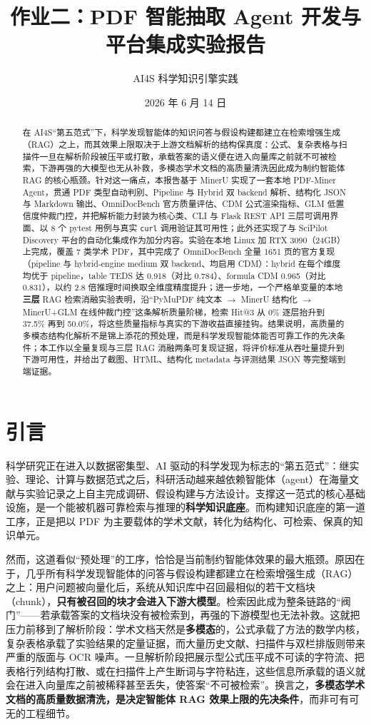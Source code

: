 \documentclass[UTF8,a4paper,11pt]{ctexart}
\title{\textbf{作业二：PDF 智能抽取 Agent 开发与平台集成实验报告}}
\author{AI4S 科学知识引擎实践}
\date{2026 年 6 月 14 日}
\begin{document}
\maketitle

\begin{abstract}
在 AI4S“第五范式”下，科学发现智能体的知识问答与假设构建都建立在检索增强生成（RAG）之上，而其效果上限取决于上游文档解析的结构保真度：公式、复杂表格与扫描件一旦在解析阶段被压平或打散，承载答案的语义便在进入向量库之前就不可被检索，下游再强的大模型也无从补救，多模态学术文档的高质量清洗因此成为制约智能体 RAG 的核心瓶颈。针对这一痛点，本报告基于 MinerU 实现了一套本地 PDF-Miner Agent，贯通 PDF 类型自动判别、Pipeline 与 Hybrid 双 backend 解析、结构化 JSON 与 Markdown 输出、OmniDocBench 官方质量评估、CDM 公式渲染指标、GLM 低置信度仲裁门控，并把解析能力封装为核心类、CLI 与 Flask REST API 三层可调用界面、以 8 个 pytest 用例与真实 \texttt{curl} 调用验证其可用性；此外还实现了与 SciPilot Discovery 平台的自动化集成作为加分内容。实验在本地 Linux 加 RTX 3090（24GB）上完成，覆盖 7 类学术 PDF，其中完成了 OmniDocBench 全量 1651 页的官方复现（pipeline 与 hybrid-engine medium 双 backend、均启用 CDM）：hybrid 在每个维度均优于 pipeline，table TEDS 达 0.918（对比 0.784）、formula CDM 0.965（对比 0.831），以约 2.8 倍推理时间换取全维度精度提升；进一步地，一个严格单变量的本地\textbf{三层} RAG 检索消融实验表明，沿``PyMuPDF 纯文本 $\to$ MinerU 结构化 $\to$ MinerU+GLM 在线仲裁门控''这条解析质量阶梯，检索 Hit@3 从 0\% 逐层抬升到 37.5\% 再到 50.0\%，将这些质量指标与真实的下游收益直接挂钩。结果说明，高质量的多模态结构化解析不是锦上添花的预处理，而是科学发现智能体能否可靠工作的先决条件；本工作以全量复现与三层 RAG 消融两条可复现证据，将评价标准从吞吐量提升到下游可用性，并给出了截图、HTML、结构化 metadata 与评测结果 JSON 等完整端到端证据。
\end{abstract}

\section{引言}
\label{sec:intro}

科学研究正在进入以数据密集型、AI 驱动的科学发现为标志的“第五范式”：继实验、理论、计算与数据范式之后，科研活动越来越依赖智能体（agent）在海量文献与实验记录之上自主完成调研、假设构建与方法设计。支撑这一范式的核心基础设施，是一个能被机器可靠检索与推理的\textbf{科学知识底座}。而构建知识底座的第一道工序，正是把以 PDF 为主要载体的学术文献，转化为结构化、可检索、保真的知识单元。

然而，这道看似“预处理”的工序，恰恰是当前制约智能体效果的最大瓶颈。原因在于，几乎所有科学发现智能体的问答与假设构建都建立在检索增强生成（RAG）之上：用户问题被向量化后，系统从知识库中召回最相似的若干文档块（chunk），\textbf{只有被召回的块才会进入下游大模型}。检索因此成为整条链路的“阀门”——若承载答案的文档块没有被检索到，再强的下游模型也无法补救。这就把压力前移到了解析阶段：学术文档天然是\textbf{多模态}的，公式承载了方法的数学内核，复杂表格承载了实验结果的定量证据，而大量历史文献、扫描件与双栏排版则带来严重的版面与 OCR 噪声。一旦解析阶段把展示型公式压平成不可读的字符流、把表格行列结构打散、或在扫描件上产生断词与字符粘连，这些信息所承载的语义就会在进入向量库之前被稀释甚至丢失，使答案“不可被检索”。换言之，\textbf{多模态学术文档的高质量数据清洗，是决定智能体 RAG 效果上限的先决条件}，而非可有可无的工程细节。
\end{document}
